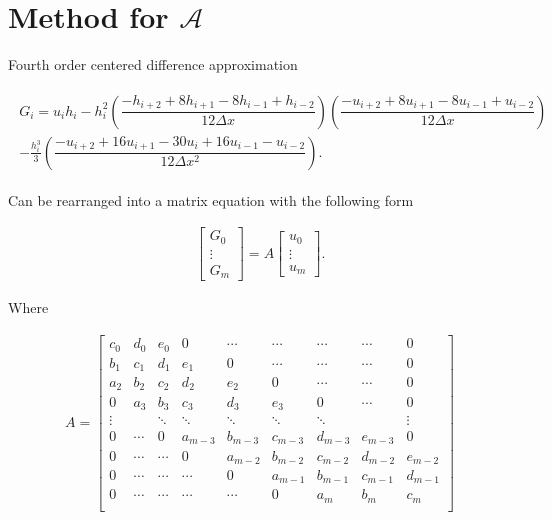 \documentclass[12pt]{article}
\begin{document}
\section{Method for $\mathcal{A}$}
Fourth order centered difference approximation
\begin{linenomath*}
	\begin{gather}
	\begin{split}
	G_i = u_ih_i - h_i^2 \left(\dfrac{-h_{i+2} + 8h_{i+1} - 8h_{i-1} + h_{i-2}}{12\Delta x}\right) \left(\dfrac{-u_{i+2} + 8u_{i+1} - 8u_{i-1} + u_{i-2}}{12\Delta x}\right) \\ - \frac{h_i^3}{3} \left(\dfrac{-u_{i+2} + 16u_{i+1} - 30u_{i} + 16u_{i-1} - u_{i-2}}{12\Delta x^2}\right).
	\end{split}
	\end{gather}
	\label{eq:Gfourthord}
\end{linenomath*}
Can be rearranged into a matrix equation with the following form 
\begin{linenomath*}
	\begin{gather*}
	\left[\begin{array}{c}
	G_0 \\
	\vdots \\
	G_m \end{array}\right]
	= A \left[\begin{array}{c}
	u_0 \\
	\vdots \\
	u_m \end{array}\right].
	\end{gather*}
\end{linenomath*}
Where
\begin{linenomath*}
	\begin{gather*}
	A =
	\left[\begin{array}{ccccccccc}
	c_0 & d_0 & e_0 & 0 & \dotsm & \dotsm & \dotsm & \dotsm & 0 \\
	b_1 & c_1 & d_1 & e_1 & 0 & \dotsm & \dotsm & \dotsm & 0 \\
	a_2 & b_2 & c_2 & d_2 & e_2 & 0 & \dotsm & \dotsm & 0  \\
	0 & a_3 & b_3 & c_3 & d_3 & e_3 & 0 & \dotsm & 0  \\
	\vdots &  &\ddots &\ddots &\ddots &\ddots &\ddots &  & \vdots \\
	0 & \dotsm & 0 & a_{m-3} & b_{m-3} & c_{m-3} & d_{m-3} & e_{m-3} & 0 \\
	0 & \dotsm & \dotsm & 0 & a_{m-2} & b_{m-2} & c_{m-2} & d_{m-2} & e_{m-2} \\
	0 & \dotsm & \dotsm & \dotsm & 0 & a_{m-1} & b_{m-1} & c_{m-1} & d_{m-1} \\
	0 & \dotsm & \dotsm & \dotsm & \dotsm & 0 & a_{m} & b_{m} & c_{m}\\
	\end{array}\right]
	\end{gather*}
\end{linenomath*}
\end{document}
